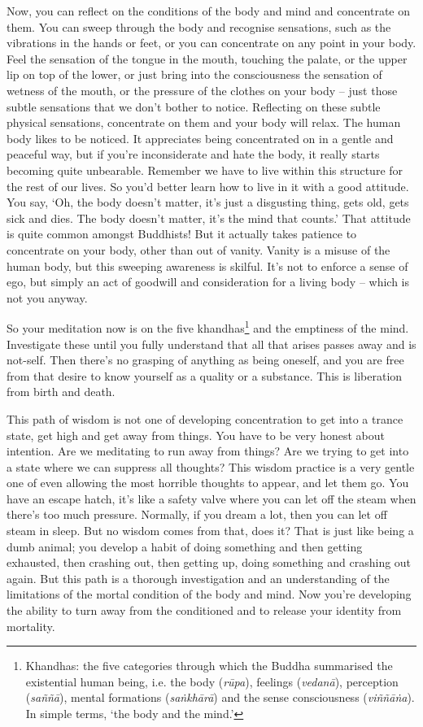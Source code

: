Now, you can reflect on the conditions of the body and mind and concentrate on them. You can sweep through the body and recognise sensations, such as the vibrations in the hands or feet, or you can concentrate on any point in your body. Feel the sensation of the tongue in the mouth, touching the palate, or the upper lip on top of the lower, or just bring into the consciousness the sensation of wetness of the mouth, or the pressure of the clothes on your body -- just those subtle sensations that we don't bother to notice. Reflecting on these subtle physical sensations, concentrate on them and your body will relax. The human body likes to be noticed. It appreciates being concentrated on in a gentle and peaceful way, but if you're inconsiderate and hate the body, it really starts becoming quite unbearable. Remember we have to live within this structure for the rest of our lives. So you'd better learn how to live in it with a good attitude. You say, `Oh, the body doesn't matter, it's just a disgusting thing, gets old, gets sick and dies. The body doesn't matter, it's the mind that counts.' That attitude is quite common amongst Buddhists! But it actually takes patience to concentrate on your body, other than out of vanity. Vanity is a misuse of the human body, but this sweeping awareness is skilful. It's not to enforce a sense of ego, but simply an act of goodwill and consideration for a living body -- which is not you anyway.

So your meditation now is on the five khandhas\footnote{Khandhas: the five categories through which the Buddha summarised the existential human being, i.e. the body (\textit{r\=upa}), feelings (\textit{vedan\=a}), perception (\textit{sa\~n\~n\=a}), mental formations (\textit{sa\.nkh\=ar\=a}) and the sense consciousness (\textit{vi\~n\~n\=a\.na}). In simple terms, `the body and the mind.'} and the emptiness of the mind. Investigate these until you fully understand that all that arises passes away and is not-self. Then there's no grasping of anything as being oneself, and you are free from that desire to know yourself as a quality or a substance. This is liberation from birth and death.

This path of wisdom is not one of developing concentration to get into a trance state, get high and get away from things. You have to be very honest about intention. Are we meditating to run away from things? Are we trying to get into a state where we can suppress all thoughts? This wisdom practice is a very gentle one of even allowing the most horrible thoughts to appear, and let them go. You have an escape hatch, it's like a safety valve where you can let off the steam when there's too much pressure. Normally, if you dream a lot, then you can let off steam in sleep. But no wisdom comes from that, does it? That is just like being a dumb animal; you develop a habit of doing something and then getting exhausted, then crashing out, then getting up, doing something and crashing out again. But this path is a thorough investigation and an understanding of the limitations of the mortal condition of the body and mind. Now you're developing the ability to turn away from the conditioned and to release your identity from mortality.

